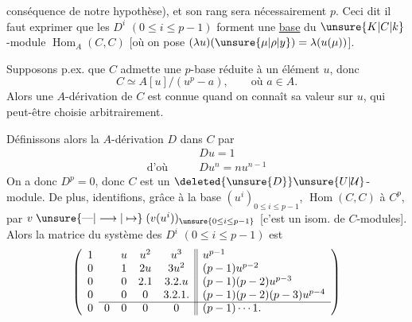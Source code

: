 conséquence de notre hypothèse), et  son rang sera nécessairement $p$. Ceci dit il faut exprimer que les $D^i$ $(0\leq i\leq p-1)$ forment une \uline{base} du $\unsure{K|C|k}$-module $\operatorname{Hom}_A(C,C)$ [où on pose $(\lambda u)(\unsure{\mu|\rho|y})=\lambda(u(\mu))$].


Supposons p.ex. que $C$ admette une $p$-base  réduite à un élément $u$, donc 
\[
C\simeq A[u]/(u^p-a),\qquad\text{où }a\in A.
\]
  Alors une $A$-dérivation de $C$ est connue quand on connaît sa valeur sur $u$, qui peut-être choisie arbitrairement.

Définissons alors la $A$-dérivation $D$ dans $C$ par
\[
\begin{aligned}
&Du=1\\
\text{d'où}\qquad &Du^n=nu^{n-1}
\end{aligned}
\]
On a donc $D^p=0$, donc $C$ est un $\deleted{\unsure{D}}\unsure{U|\mathcal U}$-module. De plus,  identifions, grâce à la base $(u^i)_{0\leq i\leq p-1}$,  $\operatorname{Hom}(C,C)$ à $C^p$, par $v\mathrel{\unsure{\text{\textemdash}|\longrightarrow|\mapsto}}(v(u^i))_{\unsure{0\leq i\leq p-1}}$ [c'est un isom. de $C$-modules]. Alors
la matrice du système des $D^i$ $(0\leq i\leq p-1)$ est
\[
\left(\begin{array}{ccccc||l}
1&&u&u^2&u^3&u^{p-1}\\
0&&1&2u&3u^2&(p-1)u^{p-2}\\
0&&0&2.1&3.2.u&(p-1)(p-2)u^{p-3}\\
0&&0&0&3.2.1.&(p-1)(p-2)(p-3)u^{p-4}\\ \cline{2-6}
0&0&0&0&0&(p-1)\cdots1.
\end{array}\right)
\]
